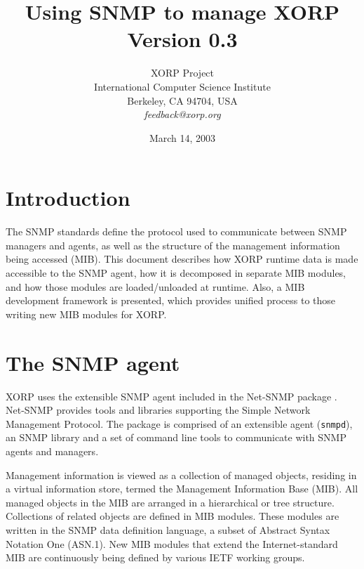 \documentclass[11pt]{article}
\begin{document}
\title{Using SNMP to manage XORP \\
\vspace{1ex}
Version 0.3}
\author{ XORP Project					\\
	 International Computer Science Institute	\\
	 Berkeley, CA 94704, USA			\\
	 {\it feedback@xorp.org}
}
\date{March 14, 2003}

\maketitle

\thispagestyle{empty}


\section{Introduction}


The SNMP standards \cite{snmp} define the protocol used to communicate between SNMP
managers and agents, as well as the structure of the management information
being accessed (MIB).  This document describes how XORP runtime data is made
accessible to the SNMP agent, how it is decomposed in separate MIB modules, and
how those modules are loaded/unloaded at runtime.  Also, a MIB development 
framework is presented, which provides unified process to those writing new MIB
modules for XORP.

\section{The SNMP agent}

XORP uses the extensible SNMP agent included in the Net-SNMP package \cite{net-snmp}.  
Net-SNMP provides tools and libraries supporting the Simple Network Management
Protocol.  The package is comprised of an extensible agent (\texttt{snmpd}), an SNMP
library and a set of command line tools to communicate with SNMP agents and
managers. 

Management information is viewed as a collection of managed objects, residing in
a virtual information store, termed the Management Information Base (MIB).  All
managed objects in the MIB are arranged in a hierarchical or tree structure.
Collections of related objects are defined in MIB modules.  These modules are
written in the SNMP data definition language, a subset of Abstract Syntax
Notation One (ASN.1).  New MIB modules that extend the Internet-standard MIB are
continuously being defined by various IETF working groups.  
\end{document}
